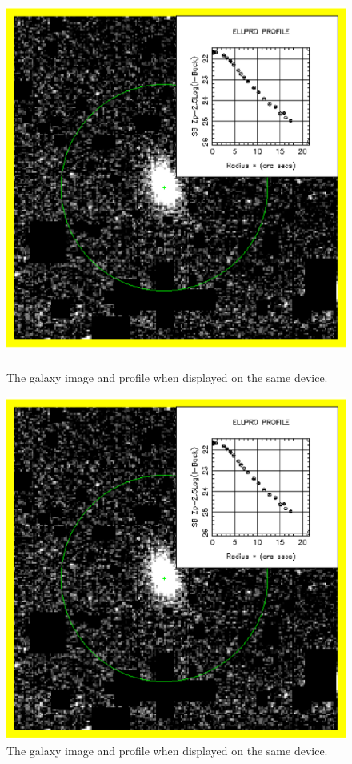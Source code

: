 \documentclass[twoside,11pt]{article}
\newenvironment{latexonly}{}{}
\begin{document}
\begin{latexonly}
\begin{figure}[htlb]
\centering 
\includegraphics[height=125mm,width=125mm]{sun180_diag3.eps}
\caption{The galaxy image and profile when displayed on the same device.}
\end{figure}
\end{latexonly}
\begin{htmlonly}
\begin{figure}[htlb]
\centering 
\includegraphics{sun180_diag3.eps}
\caption{The galaxy image and profile when displayed on the same device.}
\end{figure}
\end{htmlonly}
\end{document}

